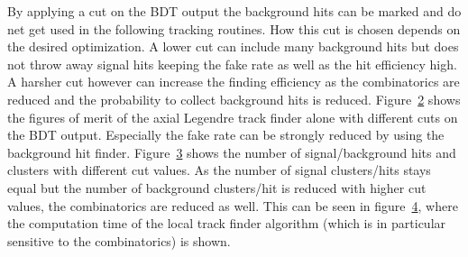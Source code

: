 \begin{figure}
  \caption{}
  \label{fig-result-background-hit-finder}
\end{figure}

By applying a cut on the BDT output the background hits can be marked and do net get used in the following tracking routines. How this cut is chosen depends on the desired optimization. A lower cut can include many background hits but does not throw away signal hits keeping the fake rate as well as the hit efficiency high. A harsher cut however can increase the finding efficiency as the combinatorics are reduced and the probability to collect background hits is reduced. Figure~\ref{fig-result-background-hit-finder2} shows the figures of merit of the axial Legendre track finder alone with different cuts on the BDT output. Especially the fake rate can be strongly reduced by using the background hit finder. Figure~\ref{fig-hits-numbers} shows the number of signal/background hits and clusters with different cut values. As the number of signal clusters/hits stays equal but the number of background clusters/hit is reduced with higher cut values, the combinatorics are reduced as well. This can be seen in figure~\ref{fig-performance-clusters}, where the computation time of the local track finder algorithm (which is in particular sensitive to the combinatorics) is shown.

\begin{figure}
  \caption{}
  \label{fig-result-background-hit-finder2}
\end{figure}

\begin{figure}
  \caption{}
  \label{fig-hits-numbers}
\end{figure}

\begin{figure}
  \caption{}
  \label{fig-performance-clusters}
\end{figure}



